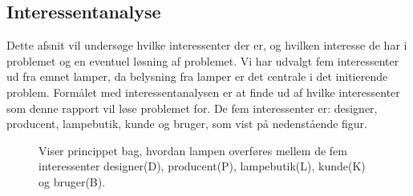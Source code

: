 \subsection{Interessentanalyse}
Dette afsnit vil undersøge hvilke interessenter der er, og hvilken interesse de har i problemet og en eventuel løsning af problemet. Vi har udvalgt fem interessenter ud fra emnet lamper, da belysning fra lamper er det centrale i det initierende problem. Formålet med interessentanalysen er at finde ud af hvilke interessenter som denne rapport vil løse problemet for. De fem interessenter er: designer, producent, lampebutik, kunde og bruger, som vist på nedenstående figur.



\begin{figure}[H]
	\centering
  \caption{Viser princippet bag, hvordan lampen overføres mellem de fem interessenter designer(D), producent(P), lampebutik(L), kunde(K) og bruger(B).}
  \label{fig:interessenter}
\end{figure}







